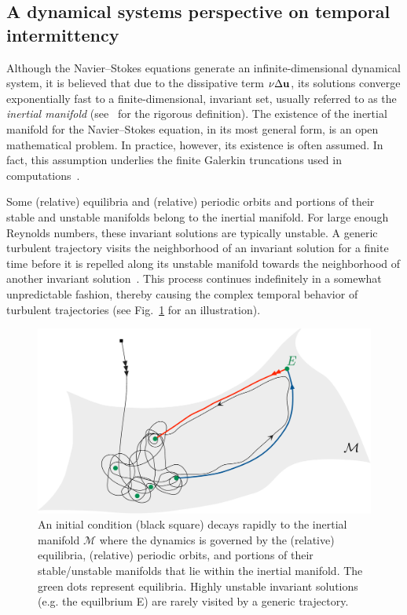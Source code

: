 \documentclass{jfm}
\begin{document}
\subsection{A dynamical systems perspective on temporal intermittency}\label{sec:inter_DS}
Although the Navier--Stokes equations generate an infinite-dimensional dynamical system,
it is believed that due to the dissipative term $\nu\Delta\mathbf u$, its
solutions converge exponentially fast to a
finite-dimensional, invariant set, usually referred to as the \emph{inertial manifold}
(see~\cite{const12} for the rigorous definition). The existence of the
inertial manifold for the Navier--Stokes equation, in its most general form,
is an open mathematical problem. In
practice, however, its existence is often assumed. In fact, this assumption
underlies the finite Galerkin truncations used in computations~\citep{foias88}.

Some (relative) equilibria
and (relative) periodic orbits and portions of their stable and unstable manifolds
belong to the inertial manifold.
For large enough Reynolds numbers, these invariant solutions
are typically unstable. A generic turbulent trajectory visits the neighborhood of an invariant
solution
for a finite time before it is repelled along its unstable manifold towards
the neighborhood of another invariant solution~\citep{ruelle91,HGCV09}.
This process continues indefinitely
in a somewhat unpredictable fashion, thereby causing the complex temporal behavior of
turbulent trajectories (see Fig.~\ref{fig:IM} for an illustration).
%
\begin{figure}
\centering
\includegraphics[width=.85\textwidth]{inertial_man}
\caption{An initial condition (black square) decays rapidly to the
inertial manifold $\mathcal M$ where the dynamics is governed by the (relative) equilibria,
(relative) periodic orbits, and portions
of their stable/unstable manifolds that
lie within the inertial manifold. The green dots represent equilibria.
Highly unstable invariant solutions (e.g. the equilbrium E)
are rarely visited by a generic trajectory.}
\label{fig:IM}
\end{figure}
\end{document}
